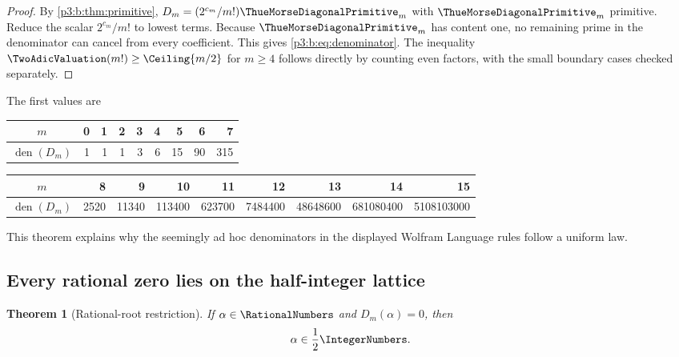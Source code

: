 \documentclass[11pt,oneside]{article}
\numberwithin{equation}{section}
\newtheorem{theorem}{Theorem}[section]
\theoremstyle{definition}
\theoremstyle{remark}
\begin{document}
\begin{proof}
By \cref{p3:b:thm:primitive},
$D_m=(2^{c_m}/m!)\ThueMorseDiagonalPrimitive_m$ with $\ThueMorseDiagonalPrimitive_m$ primitive.  Reduce the scalar
$2^{c_m}/m!$ to lowest terms.  Because $\ThueMorseDiagonalPrimitive_m$ has content one, no remaining
prime in the denominator can cancel from every coefficient.  This gives
\eqref{p3:b:eq:denominator}.  The inequality
$\TwoAdicValuation(m!)\ge\Ceiling{m/2}$ for $m\ge4$ follows directly by counting even
factors, with the small boundary cases checked separately.
\end{proof}

The first values are
\begin{center}
\small
\begin{tabular}{c|rrrrrrrr}
\toprule
$m$&0&1&2&3&4&5&6&7\\
\midrule
$\operatorname{den}(D_m)$&1&1&1&3&6&15&90&315\\
\bottomrule
\end{tabular}

\medskip
\begin{tabular}{c|rrrrrrrr}
\toprule
$m$&8&9&10&11&12&13&14&15\\
\midrule
$\operatorname{den}(D_m)$
&2520&11340&113400&623700&7484400&48648600&681080400&5108103000\\
\bottomrule
\end{tabular}
\end{center}
This theorem explains why the seemingly ad hoc denominators in the displayed
Wolfram Language rules follow a uniform law.

\subsection{Every rational zero lies on the half-integer lattice}

\begin{theorem}[Rational-root restriction]
\label{p3:b:thm:rational-root-half}
If $\alpha\in\RationalNumbers$ and $D_m(\alpha)=0$, then
\begin{equation}
 \alpha\in\frac12\IntegerNumbers.
 \label{p3:b:eq:rational-root-half}
\end{equation}
\end{theorem}
\end{document}
